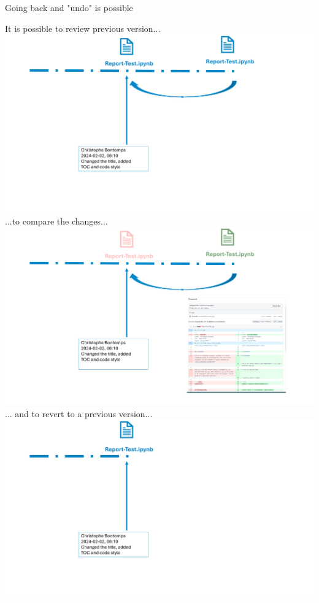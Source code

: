 \documentclass[xcolor=x11names,compress]{beamer}
\renewcommand{\(}{\begin{columns}}
\renewcommand{\)}{\end{columns}}
\newcommand{\<}[1]{\begin{column}{#1}}
\renewcommand{\>}{\end{column}}
\begin{document}
\begin{frame}{Going back and "undo" is possible}
\begin{center}
\begin{itemize}
    {It is possible to review previous version... \\ }
    {\includegraphics[width = 1.0\textwidth]{FileLifeBack.png} \\ }
    {...to compare the changes...  }
    {\includegraphics[width = 1.0\textwidth]{FileLifeDiff.png} \\ }
    {... and to revert  to a  previous version... }
    {\includegraphics[width = 1.0\textwidth]{FileLifeRevert.png} \\ }

\end{itemize}
\end{center}
\end{frame}
\end{document}
